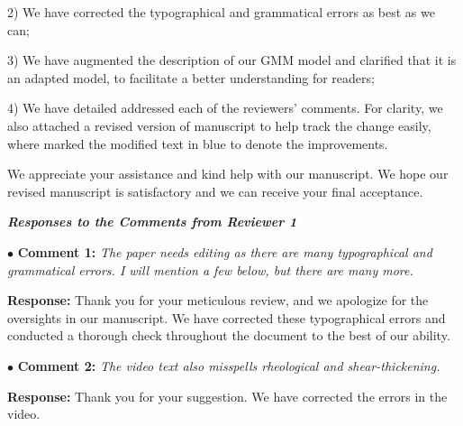 \documentclass[12pt,a4paper]{article}
\begin{document}
2) We have corrected the typographical and grammatical errors as best as we can; 

3) We have augmented the description of our GMM model and clarified that it is an adapted model, to facilitate a better understanding for readers;

4) We have detailed addressed each of the reviewers' comments. For clarity, we also attached a revised version of manuscript to help track the change easily, where marked the modified text in blue to denote the improvements.

\vspace{0.5cm}
We appreciate your assistance and kind help with our manuscript. We hope our revised manuscript is satisfactory and we can receive your final acceptance.

\newpage
\vspace{-1.5cm}
\begin{flushleft}
	\textit{\textbf{Responses to the Comments from Reviewer 1}}
\end{flushleft}


\vspace{0.4cm}
\noindent$\bullet$ \enspace \textbf{Comment 1:}
\textit{The paper needs editing as there are many typographical and grammatical errors. I will mention a few below, but there are many more. }

\vspace{0.2cm}
\textbf{Response:}
Thank you for your meticulous review, and we apologize for the oversights in our manuscript. We have corrected these typographical errors and conducted a thorough check throughout the document to the best of our ability.


\vspace{0.4cm}
\noindent$\bullet$ \enspace \textbf{Comment 2:}
\textit{The video text also misspells rheological and shear-thickening.}

\vspace{0.2cm}
\textbf{Response:}
Thank you for your suggestion. We have corrected the errors in the video.
\end{document}
